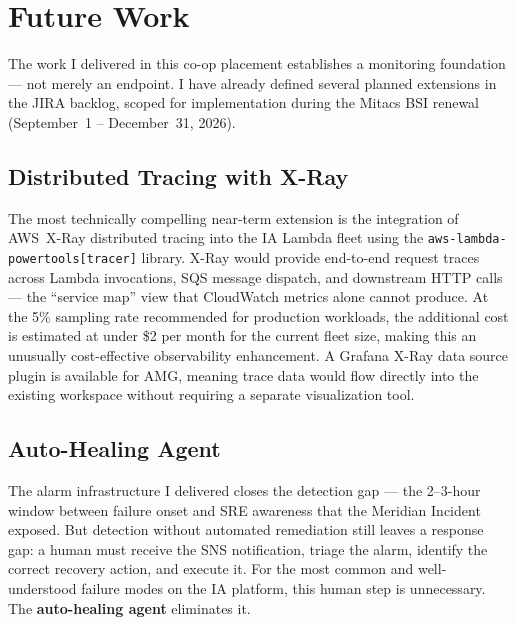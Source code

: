 
\chapter{Future Work}
\label{chap:future_work}

The work I delivered in this co-op placement establishes a monitoring foundation --- not merely an endpoint. I have already defined several planned extensions in the JIRA
backlog, scoped for implementation during the Mitacs BSI renewal
(September~1 -- December~31, 2026).


\section{Distributed Tracing with X-Ray}
\label{sec:future_xray}

The most technically compelling near-term extension is the integration of
AWS~X-Ray distributed tracing into the IA Lambda fleet using the
\texttt{aws-lambda-powertools[tracer]} library. X-Ray would provide
end-to-end request traces across Lambda invocations, SQS message dispatch,
and downstream HTTP calls --- the ``service map'' view that CloudWatch metrics
alone cannot produce. At the 5\% sampling rate recommended for
production workloads, the additional cost is estimated at under \$2 per month
for the current fleet size, making this an unusually cost-effective
observability enhancement. A Grafana X-Ray data source plugin is available
for AMG, meaning trace data would flow directly into the existing workspace
without requiring a separate visualization tool.


\section{Auto-Healing Agent}
\label{sec:future_autohealing}

The alarm infrastructure I delivered closes the detection gap --- the 2--3-hour
window between failure onset and SRE awareness that the Meridian Incident
exposed. But detection without automated remediation still leaves a response
gap: a human must receive the SNS notification, triage the alarm, identify
the correct recovery action, and execute it. For the most common and
well-understood failure modes on the IA platform, this human step is
unnecessary. The \textbf{auto-healing agent} eliminates it.

